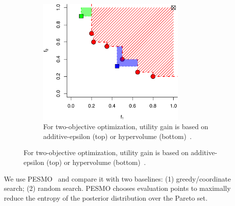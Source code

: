 \begin{figure}
\begin{subfigure}{0.40\textwidth}
    \includegraphics[width=0.8\textwidth]{figures/serving-bo-2d-2.pdf}
    \caption{For two-objective optimization, utility gain is based on
      additive-epsilon (top) or hypervolume (bottom)~\cite{binoisgpareto}.}
  \end{subfigure}
\end{figure}


We use PESMO~\cite{hernandez2016predictive} and compare it with two baselines:
(1) greedy/coordinate search; (2) random search. PESMO chooses evaluation points
to maximally reduce the entropy of the posterior distribution over the Pareto
set.

